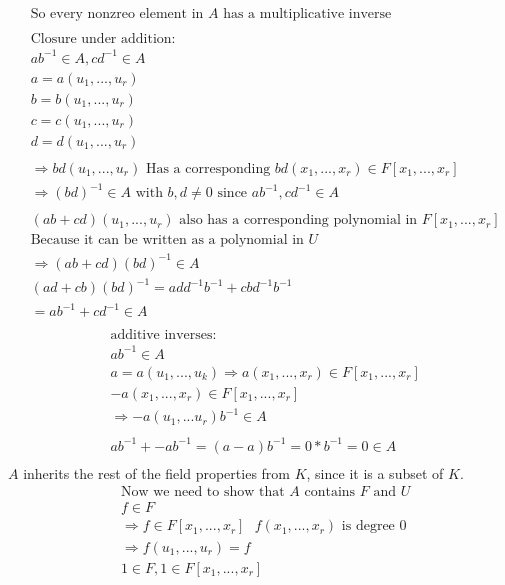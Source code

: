 \documentclass[11pt]{article}
\begin{document}
{\begin{align*}
&\text{So every nonzreo element in $A$ has a multiplicative inverse}\\
&\\
&\text{Closure under addition:}\\
&ab^{-1} \in A, cd^{-1} \in A\\
&a = a(u_1, ..., u_r)\\
&b = b(u_1, ..., u_r)\\
&c = c(u_1, ..., u_r)\\
&d = d(u_1, ..., u_r)\\
&\\
&\Rightarrow bd(u_1, ..., u_r) \text{ Has a corresponding } bd(x_1, ..., x_r) \in F[x_1, ..., x_r]\\
&\Rightarrow (bd)^{-1} \in A \text{ with $b, d \neq 0$ since $ab^{-1}, cd^{-1} \in A$}\\
&\\
&(ab+cd)(u_1, ..., u_r) \text{ also has a corresponding polynomial in } F[x_1, ..., x_r]\\
&\text{Because it can be written as a polynomial in $U$}\\
&\Rightarrow (ab+cd)(bd)^{-1} \in A\\
&(ad+cb)(bd)^{-1} = add^{-1}b^{-1} + cbd^{-1}b^{-1}\\
& = ab^{-1} + cd^{-1} \in A\\
\end{align*}
\begin{align*}
&\text{additive inverses:}\\
&ab^{-1} \in A\\
&a = a(u_1, ..., u_k) \Rightarrow a(x_1, ..., x_r) \in F[x_1, ..., x_r]\\
&-a(x_1, ..., x_r) \in F[x_1, ..., x_r]\\
&\Rightarrow -a(u_1, ... u_r)b^{-1} \in A\\
&\\
&ab^{-1} + -ab^{-1} = (a-a)b^{-1} = 0*b^{-1} = 0 \in A\\
\end{align*}
$A$ inherits the rest of the field properties from $K$, since it is a subset of $K$.
\begin{align*}
&\text{Now we need to show that $A$ contains $F$ and $U$}\\
&f \in F\\
&\Rightarrow f \in F[x_1, ..., x_r] \text{ $f(x_1, ..., x_r)$ is degree 0}\\
&\Rightarrow f(u_1, ..., u_r) = f \\
&1 \in F, 1 \in F[x_1, ..., x_r]\\

\end{align*}}
\end{document}
